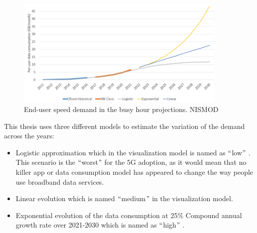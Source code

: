 
\begin{figure}[H]
	\begin{Center}
		\includegraphics[width=0.9\textwidth]{./media/image20.png}
		\caption{End-user speed demand in the busy hour projections. NISMOD\cite{3-07}}
	\end{Center}
\end{figure}




This thesis uses three different models to estimate the variation of the demand across the years:\par

\begin{itemize}
	\item Logistic approximation which in the visualization model is named as $``$low$"$ . This scenario is the $``$worst$"$  for the 5G adoption, as it would mean that no killer app or data consumption model has appeared to change the way people use broadband data services.\par

	\item Linear evolution which is named $``$medium$"$  in the visualization model.\par

	\item Exponential evolution of the data consumption at 25$\%$  Compound annual growth rate over 2021-2030 which is named as $``$high$"$ .
\end{itemize}

\vspace{\baselineskip}



